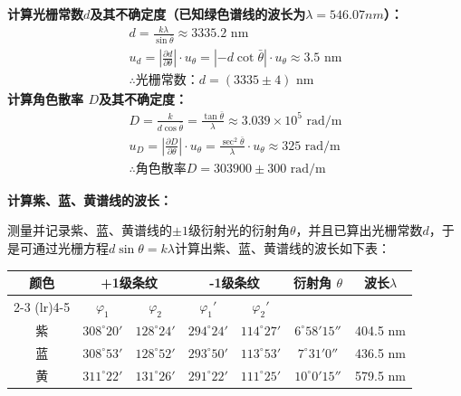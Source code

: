 \documentclass[10pt,a4paper]{ctexart}
\begin{document}
\textbf{计算光栅常数$d $及其不确定度（已知绿色谱线的波长为$\lambda = 546.07 nm$）：}
\begin{gather*}
    d = \frac{k \lambda}{\sin \bar{\theta}} \approx 3335.2 \text{ nm}\\
    u_d = \left| \frac{\partial d}{\partial \theta } \right| \cdot u_\theta = \left| -d \cot \bar{\theta} \right| \cdot u_\theta \approx 3.5 \text{ nm}\\
    \therefore \text{光栅常数：} d = (3335 \pm 4) \text{ nm}
\end{gather*}
\textbf{计算角色散率 $D$及其不确定度：}
\begin{gather*}
    D = \frac{k}{d \cos \bar{\theta}} = \frac{\tan \bar{\theta}}{\lambda} \approx 3.039 \times 10^5 \text{ rad/m}\\
    u_D = \left|\frac{\partial D}{\partial \theta}\right| \cdot u_\theta =\frac{\sec^2 \bar{\theta}}{\lambda} \cdot u_\theta \approx 325 \text{ rad/m} \\ 
    \therefore \text{角色散率}D = 303900 \pm 300 \text{ rad/m}
\end{gather*}


\textbf{计算紫、蓝、黄谱线的波长：}

测量并记录紫、蓝、黄谱线的$\pm 1$级衍射光的衍射角$\theta $，并且已算出光栅常数$d$，于是可通过光栅方程$d \sin \theta =k\lambda $计算出紫、蓝、黄谱线的波长如下表：

    \begin{table}[H] %
    \centering 
    \label{tab:my_experiment} 
    \begin{tabular}{*{7}{c}}
        \toprule
        \multirow{2}{*}{颜色} & \multicolumn{2}{c}{+1级条纹} & \multicolumn{2}{c}{-1级条纹} & \multirow{2}{*}{衍射角 $\theta$} & \multirow{2}{*}{波长$\lambda$}\\
        \cmidrule(lr){2-3} \cmidrule(lr){4-5}
        & \multicolumn{1}{c|}{$\varphi _1$} & $\varphi _2$ & \multicolumn{1}{c|}{$\varphi _1'$} & $\varphi _2'$ &  \\ %
        
        \midrule
        紫 & $308^\circ20'$& $128^\circ24'$& $294^\circ24'$& $114^\circ27'$& $6^\circ58'15''$ & 404.5 nm\\

        蓝 & $308^\circ53'$& $128^\circ52'$& $293^\circ50'$& $113^\circ53'$& $7^\circ31'0''$ & 436.5 nm\\

        黄 & $311^\circ22'$& $131^\circ26'$& $291^\circ22'$& $111^\circ25'$& $10^\circ0'15''$ & 579.5 nm\\

        \bottomrule
    \end{tabular}
    \end{table}
\end{document}

